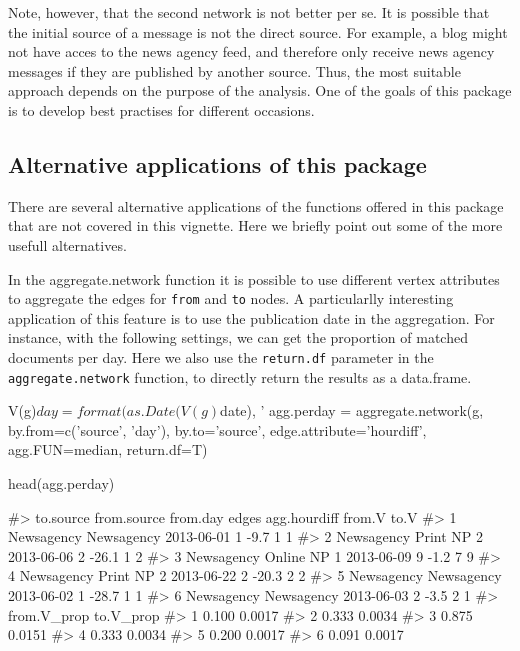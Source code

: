Note, however, that the second network is not better per se. It is
possible that the initial source of a message is not the direct source.
For example, a blog might not have acces to the news agency feed, and
therefore only receive news agency messages if they are published by
another source. Thus, the most suitable approach depends on the purpose
of the analysis. One of the goals of this package is to develop best
practises for different occasions.

\subsection{Alternative applications of this
package}\label{alternative-applications-of-this-package}

There are several alternative applications of the functions offered in
this package that are not covered in this vignette. Here we briefly
point out some of the more usefull alternatives.

In the aggregate.network function it is possible to use different vertex
attributes to aggregate the edges for \texttt{from} and \texttt{to}
nodes. A particularlly interesting application of this feature is to use
the publication date in the aggregation. For instance, with the
following settings, we can get the proportion of matched documents per
day. Here we also use the \texttt{return.df} parameter in the
\texttt{aggregate.network} function, to directly return the results as a
data.frame.

\begin{Schunk}
\begin{Sinput}
V(g)$day = format(as.Date(V(g)$date), '%Y-%m-%d')
agg.perday = aggregate.network(g, by.from=c('source', 'day'), by.to='source', 
                                  edge.attribute='hourdiff', agg.FUN=median, 
                                  return.df=T)

head(agg.perday)
\end{Sinput}
\begin{Soutput}
#>    to.source from.source   from.day edges agg.hourdiff from.V to.V
#> 1 Newsagency  Newsagency 2013-06-01     1         -9.7      1    1
#> 2 Newsagency  Print NP 2 2013-06-06     2        -26.1      1    2
#> 3 Newsagency Online NP 1 2013-06-09     9         -1.2      7    9
#> 4 Newsagency  Print NP 2 2013-06-22     2        -20.3      2    2
#> 5 Newsagency  Newsagency 2013-06-02     1        -28.7      1    1
#> 6 Newsagency  Newsagency 2013-06-03     2         -3.5      2    1
#>   from.V_prop to.V_prop
#> 1       0.100    0.0017
#> 2       0.333    0.0034
#> 3       0.875    0.0151
#> 4       0.333    0.0034
#> 5       0.200    0.0017
#> 6       0.091    0.0017
\end{Soutput}
\end{Schunk}

